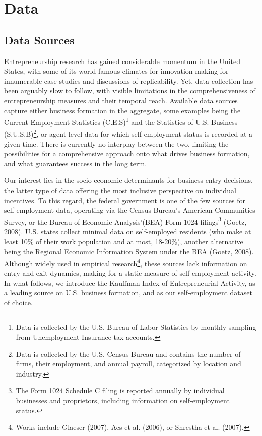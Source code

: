 \chapter{Data\label{ch:data}}

\section{Data Sources}

Entrepreneurship research has gained considerable momentum in the United States, with some of its world-famous climates for innovation making for innumerable case studies and discussions of replicability. Yet, data collection has been arguably slow to follow, with visible limitations in the comprehensiveness of entrepreneurship measures and their temporal reach. Available data sources capture either business formation in the aggregate, some examples being the Current Employment Statistics (C.E.S)\footnote{Data is collected by the U.S. Bureau of Labor Statistics by monthly sampling from Unemployment Insurance tax accounts.} and the Statistics of U.S. Business (S.U.S.B)\footnote{Data is collected by the U.S. Census Bureau and contains the number of firms, their employment, and annual payroll, categorized by location and industry.}, or agent-level data for which self-employment status is recorded at a given time. There is currently no interplay between the two, limiting the possibilities for a comprehensive approach onto what drives business formation, and what guarantees success in the long term. 

Our interest lies in the socio-economic determinants for business entry decisions, the latter type of data offering the most inclusive perspective on individual incentives. To this regard, the federal government is one of the few sources for self-employment data, operating via the Census Bureau’s American Communities Survey, or the Bureau of Economic Analysis'(BEA) Form 1024 filings\footnote{The Form 1024 Schedule C filing is reported annually by individual businesses and proprietors, including information on self-employment status. } (Goetz, 2008). U.S. states collect minimal data on self-employed residents (who make at least 10\% of their work population and at most, 18-20\%), another alternative being the Regional Economic Information System under the BEA (Goetz, 2008). Although widely used in empirical research\footnote{Works include Glaeser (2007), Acs et al. (2006), or Shrestha et al. (2007). }, these sources lack information on entry and exit dynamics, making for a  static measure of self-employment activity. In what follows, we introduce the Kauffman Index of Entrepreneurial Activity, as a leading source on U.S. business formation, and as our self-employment dataset of choice. 

